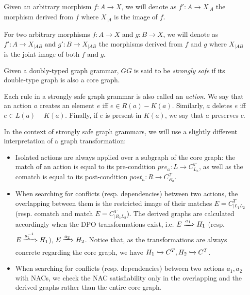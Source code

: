 \begin{notation} Given an arbitrary morphism $f : A \rightarrow X$, we will denote as $f' : A \rightarrow X_{|A}$ the morphism derived from $f$ where $X_{|A}$ is the image of $f$.

  For two arbitrary morphisms $f : A \rightarrow X$ and $g : B \rightarrow X$, we will denote as $f' : A \rightarrow X_{|AB}$ and $g' : B \rightarrow X_{|AB}$ the morphisms derived from $f$ and $g$ where $X_{|AB}$ is the joint image of both $f$ and $g$.
\end{notation}

\begin{definition} Given \doublyTypedGraphGrammarCore{} a doubly-typed graph grammar, $GG$ is said to be \emph{strongly safe} if its double-type graph is also a core graph.

  Each rule in a strongly safe graph grammar is also called an \emph{action}. We say that an action $a$ creates an element $e$ iff $e \in R(a) - K(a)$. Similarly, $a$ deletes $e$ iff \mbox{$e \in L(a) - K(a)$}. Finally, if $e$ is present in $K(a)$, we say that $a$ preserves $e$.
\end{definition}

In the context of strongly safe graph grammars, we will use a slightly different interpretation of a graph transformation:
  
\begin{itemize} 
  \item Isolated actions are always applied over a subgraph of the core graph: the match of an action is equal to its pre-condition $pre_a : L \rightarrow C^T_{L_a}$, as well as the comatch is equal to its post-condition $post_a : R \rightarrow C^T_{R_a}$.

  \item When searching for conflicts (resp. dependencies) between two actions, the overlapping between them is the restricted image of their matches $E = C^T_{|L_1L_2}$ (resp. comatch and match $E = C^T_{|R_1L_2}$). The derived graphs are calculated accordingly when the DPO transformations exist, i.e. \mbox{$E \xRightarrow{a_1} H_1$} (resp. \mbox{$E \xRightarrow{a^{-1}_1} H_1$}), \mbox{$E \xRightarrow{a_2} H_2$}. Notice that, as the transformations are always concrete regarding the core
    graph, we have $H_1 \xhookrightarrow{} C^T, H_2 \xhookrightarrow{} C^T$.

  \item When searching for conflicts (resp. dependencies) between two actions $a_1,a_2$ with NACs, we check the NAC satisfiability only in the overlapping and the derived graphs rather than the entire core graph.
\end{itemize}

